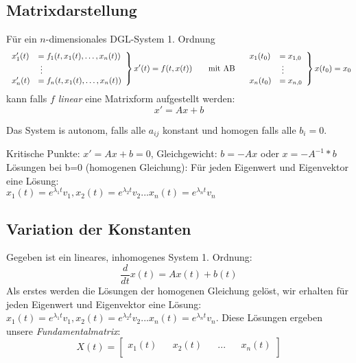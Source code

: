 \subsection{Matrixdarstellung}
Für ein $n$-dimensionales DGL-System 1. Ordnung
\begin{equation*}
    \left.
    \begin{array}{ll}
        x_1'(t) &= f_1(t,x_1(t),\ldots,x_n(t)) \\
        &\hspace{1mm}\vdots \\
        x_n'(t) &= f_n(t,x_1(t),\ldots,x_n(t)) \\
    \end{array}
    \right\}
    x'(t) = f(t,x(t))
    \qquad \text{mit AB} \quad
    \left.
    \begin{array}{ll}
        x_1(t_0) &= x_{1,0} \\
        &\hspace{1mm}\vdots \\
        x_n(t_0) &= x_{n,0} \\
    \end{array}
    \right\}
    x(t_0) = x_0    
\end{equation*}
kann falls \emph{$f$ linear} eine Matrixform aufgestellt werden:
\[ x' = Ax + b \]

Das System is autonom, falls alle $a_{ij}$ konstant und homogen falls alle $b_i=0$.

Kritische Punkte: $x' = Ax + b = 0$, Gleichgewicht: $b = -Ax$ oder $x = -A^{-1}*b$\\
Lösungen bei b=0 (homogenen Gleichung): Für jeden Eigenwert und Eigenvektor eine Lösung: \\
$x_1(t) = e^{\lambda_1t}v_1,x_2(t) = e^{\lambda_2t}v_2...x_n(t) = e^{\lambda_nt}v_n$\\

\subsection{Variation der Konstanten}
Gegeben ist ein lineares, inhomogenes System 1. Ordnung: \\
\begin{equation*}
\frac{d}{dt}x(t) = Ax(t) + b(t) 
\end{equation*}
Als erstes werden die Lösungen der homogenen Gleichung gelöst, wir erhalten für jeden Eigenwert und Eigenvektor eine Lösung: 
$x_1(t) = e^{\lambda_1t}v_1,x_2(t) = e^{\lambda_2t}v_2...x_n(t) = e^{\lambda_nt}v_n$. 
Diese Lösungen ergeben unsere \emph{Fundamentalmatrix}:\\
\begin{equation*}
X(t) = 
	\begin{bmatrix} 
	        x_1(t) && x_2(t) && ... && x_n(t)\\    
	\end{bmatrix}
\end{equation*}

